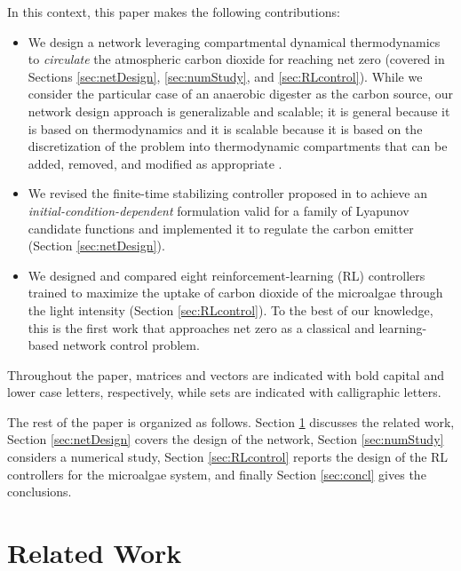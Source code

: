 \documentclass[lettersize,journal]{IEEEtran}
\begin{document}
In this context, this paper makes the following contributions: 
\begin{itemize}
\item{We design a network leveraging compartmental dynamical thermodynamics \cite{haddad2019dynamical} to \emph{circulate} the atmospheric carbon dioxide for reaching net zero (covered in Sections \ref{sec:netDesign}, \ref{sec:numStudy}, and \ref{sec:RLcontrol}). While we consider the particular case of an anaerobic digester as the carbon source, our network design approach is generalizable and scalable; it is general because it is based on thermodynamics \cite{haddad2017thermodynamics} and it is scalable because it is based on the discretization of the problem into thermodynamic compartments that can be added, removed, and modified as appropriate \cite{zocco2023thermodynamical,zocco2024unification}.} 
\item{We revised the finite-time stabilizing controller proposed in \cite{haddad2015finite} to achieve an \emph{initial-condition-dependent} formulation valid for a family of Lyapunov candidate functions and implemented it to regulate the carbon emitter (Section \ref{sec:netDesign}).}
\item{We designed and compared eight reinforcement-learning (RL) controllers trained to maximize the uptake of carbon dioxide of the microalgae through the light intensity (Section \ref{sec:RLcontrol}). To the best of our knowledge, this is the first work that approaches net zero as a classical and learning-based network control problem.}
\end{itemize}

Throughout the paper, matrices and vectors are indicated with bold capital and lower case letters, respectively, while sets are indicated with calligraphic letters. 

The rest of the paper is organized as follows. Section \ref{sec:relWork} discusses the related work, Section \ref{sec:netDesign} covers the design of the network, Section \ref{sec:numStudy} considers a numerical study, Section \ref{sec:RLcontrol} reports the design of the RL controllers for the microalgae system, and finally Section \ref{sec:concl} gives the conclusions. %




\section{Related Work}\label{sec:relWork}
\end{document}
